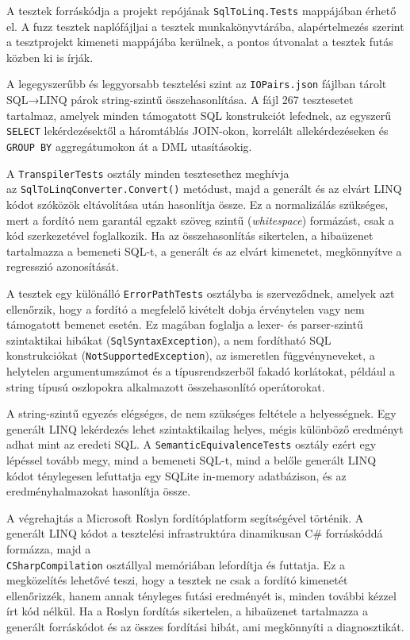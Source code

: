 A tesztek forráskódja a projekt repójának \texttt{SqlToLinq.Tests} mappájában érhető el. A fuzz tesztek naplófájljai a tesztek munkakönyvtárába, alapértelmezés szerint a tesztprojekt kimeneti mappájába kerülnek, a pontos útvonalat a tesztek futás közben ki is írják.


A legegyszerűbb és leggyorsabb tesztelési szint az \texttt{IOPairs.json} fájlban tárolt SQL→LINQ párok string-szintű összehasonlítása. A fájl 267 tesztesetet tartalmaz, amelyek minden támogatott SQL konstrukciót lefednek, az egyszerű \texttt{SELECT} lekérdezésektől a háromtáblás JOIN-okon, korrelált allekérdezéseken és \texttt{GROUP BY} aggregátumokon át a DML utasításokig.

A \texttt{TranspilerTests} osztály minden tesztesethez meghívja \\az \texttt{SqlToLinqConverter.Convert()} metódust, majd a generált és az elvárt LINQ kódot szóközök eltávolítása után hasonlítja össze. Ez a normalizálás szükséges, mert a fordító nem garantál egzakt szöveg szintű (\textit{whitespace}) formázást, csak a kód szerkezetével foglalkozik. Ha az összehasonlítás sikertelen, a hibaüzenet tartalmazza a bemeneti SQL-t, a generált és az elvárt kimenetet, megkönnyítve a regresszió azonosítását.

A tesztek egy különálló \texttt{ErrorPathTests} osztályba is szerveződnek, amelyek azt ellenőrzik, hogy a fordító a megfelelő kivételt dobja érvénytelen vagy nem támogatott bemenet esetén. Ez magában foglalja a lexer- és parser-szintű szintaktikai hibákat (\texttt{SqlSyntaxException}), a nem fordítható SQL konstrukciókat (\texttt{NotSupportedException}), az ismeretlen függvényneveket, a helytelen argumentumszámot és a típusrendszerből fakadó korlátokat, például a string típusú oszlopokra alkalmazott összehasonlító operátorokat.


A string-szintű egyezés elégséges, de nem szükséges feltétele a helyességnek. Egy generált LINQ lekérdezés lehet szintaktikailag helyes, mégis különböző eredményt adhat mint az eredeti SQL. A \texttt{SemanticEquivalenceTests} osztály ezért egy lépéssel tovább megy, mind a bemeneti SQL-t, mind a belőle generált LINQ kódot ténylegesen lefuttatja egy SQLite in-memory adatbázison, és az eredményhalmazokat hasonlítja össze.

A végrehajtás a Microsoft Roslyn fordítóplatform segítségével történik. A generált LINQ kódot a tesztelési infrastruktúra dinamikusan C\# forráskóddá formázza, majd a \\ \texttt{CSharpCompilation} osztállyal memóriában lefordítja és futtatja. Ez a megközelítés lehetővé teszi, hogy a tesztek ne csak a fordító kimenetét ellenőrizzék, hanem annak tényleges futási eredményét is, minden további kézzel írt kód nélkül. Ha a Roslyn fordítás sikertelen, a hibaüzenet tartalmazza a generált forráskódot és az összes fordítási hibát, ami megkönnyíti a diagnosztikát.

